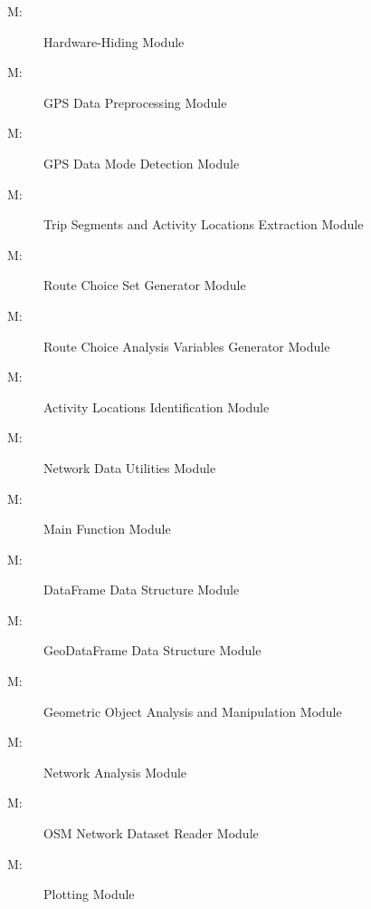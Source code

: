 \documentclass[12pt, titlepage]{article}
\newcounter{mnum}
\newcommand{\mthemnum}{M\themnum}
\begin{document}
\begin{description}
\item [ \mthemnum \label{mHH}:] Hardware-Hiding Module
\item [ \mthemnum \label{mGP}:] GPS Data Preprocessing Module 
\item [ \mthemnum \label{mMD}:] GPS Data Mode Detection Module 
\item [ \mthemnum \label{mTSALE}:] Trip Segments and Activity Locations Extraction Module
\item [ \mthemnum \label{mRCS}:] Route Choice Set Generator Module
\item [ \mthemnum \label{mRCAV}:] Route Choice Analysis Variables Generator Module
\item [ \mthemnum \label{mALI}:] Activity Locations Identification Module
\item [ \mthemnum \label{mNDUM}:] Network Data Utilities Module
\item [ \mthemnum \label{mMF}:] Main Function Module
\item [ \mthemnum \label{mDFDS}:] DataFrame Data Structure Module
\item [ \mthemnum \label{mGDFDS}:] GeoDataFrame Data Structure Module
\item [ \mthemnum \label{mGOAM}:] Geometric Object Analysis and Manipulation Module
\item [ \mthemnum \label{mNA}:] Network Analysis Module
\item [ \mthemnum \label{mOSMNDR}:] OSM Network Dataset Reader Module
\item [ \mthemnum \label{mP}:] Plotting Module
\end{description}
\end{document}
